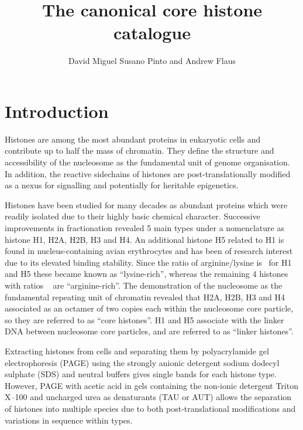 \documentclass[10pt,a4paper,draft,article]{memoir}
\author{David Miguel Susano Pinto and Andrew Flaus}
\title{The canonical core histone catalogue}
\begin{document}
  \maketitle

  \section{Introduction}

    Histones are among the most abundant proteins in eukaryotic cells and contribute up
    to half the mass of chromatin. They define the structure and accessibility of the
    nucleosome as the fundamental unit of genome organisation. In addition, the reactive
    sidechains of histones are post-translationally modified as a nexus for signalling
    and potentially for heritable epigenetics.

    Histones have been studied for many decades as abundant proteins which were readily
    isolated due to their highly basic chemical character. Successive improvements in
    fractionation revealed 5 main types under a nomenclature as histone H1, H2A, H2B, H3
    and H4\citep{nomenclature}.  %
    An additional histone H5 related to H1 is found in nucleus-containing avian
    erythrocytes and has been of research interest due to its elevated binding stability.
    Since the ratio of arginine/lysine is \HOneArgLysRatio\ for H1 and H5 these became known as
    ``lysine-rich'', whereas the remaining 4 histones with ratios \OthersArgLysRatio\  are ``arginine-rich''.
    The demonstration of the nucleosome as the fundamental repeating unit of chromatin revealed
    that H2A, H2B, H3 and H4 associated as an octamer of two copies each within the
    nucleosome core particle, so they are referred to as ``core histones''. H1 and H5
    associate with the linker DNA between nucleosome core particles, and are referred to
    as ``linker histones''.

    Extracting histones from cells and separating them by polyacrylamide gel electrophoresis
    (PAGE) using the strongly anionic detergent sodium dodecyl sulphate (SDS) and neutral
    buffers gives single bands for each histone type. However, PAGE with acetic acid in gels
    containing the non-ionic detergent Triton X--100 and uncharged urea as denaturants
    (TAU or AUT) allows the separation of histones into multiple species due to both
    post-translational modifications and variations in sequence within types.
\end{document}
